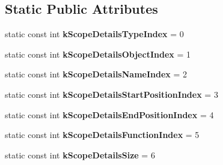\subsection*{Static Public Attributes}
\begin{DoxyCompactItemize}
\item 
static const int {\bfseries k\+Scope\+Details\+Type\+Index} = 0\hypertarget{classv8_1_1internal_1_1_scope_iterator_a3e667203bbc187b52d0661caa6339e40}{}\label{classv8_1_1internal_1_1_scope_iterator_a3e667203bbc187b52d0661caa6339e40}

\item 
static const int {\bfseries k\+Scope\+Details\+Object\+Index} = 1\hypertarget{classv8_1_1internal_1_1_scope_iterator_ae6a44f9c5bccc8c3b7723aff91799be1}{}\label{classv8_1_1internal_1_1_scope_iterator_ae6a44f9c5bccc8c3b7723aff91799be1}

\item 
static const int {\bfseries k\+Scope\+Details\+Name\+Index} = 2\hypertarget{classv8_1_1internal_1_1_scope_iterator_a0fa8f4e43705cae688f30273ffed44a7}{}\label{classv8_1_1internal_1_1_scope_iterator_a0fa8f4e43705cae688f30273ffed44a7}

\item 
static const int {\bfseries k\+Scope\+Details\+Start\+Position\+Index} = 3\hypertarget{classv8_1_1internal_1_1_scope_iterator_a55df03c1c266defde7f6865e9e77a2c6}{}\label{classv8_1_1internal_1_1_scope_iterator_a55df03c1c266defde7f6865e9e77a2c6}

\item 
static const int {\bfseries k\+Scope\+Details\+End\+Position\+Index} = 4\hypertarget{classv8_1_1internal_1_1_scope_iterator_aeffdea2c156b25a4b9f6eccd04fa2317}{}\label{classv8_1_1internal_1_1_scope_iterator_aeffdea2c156b25a4b9f6eccd04fa2317}

\item 
static const int {\bfseries k\+Scope\+Details\+Function\+Index} = 5\hypertarget{classv8_1_1internal_1_1_scope_iterator_adc82682c88345e47935566837511d14d}{}\label{classv8_1_1internal_1_1_scope_iterator_adc82682c88345e47935566837511d14d}

\item 
static const int {\bfseries k\+Scope\+Details\+Size} = 6\hypertarget{classv8_1_1internal_1_1_scope_iterator_aaccef289782f1fd53edc2dd1d3989681}{}\label{classv8_1_1internal_1_1_scope_iterator_aaccef289782f1fd53edc2dd1d3989681}

\end{DoxyCompactItemize}
